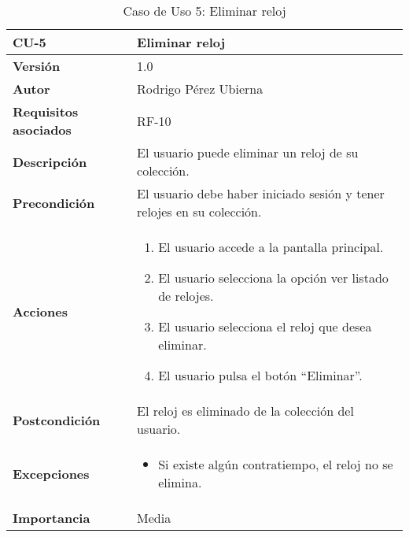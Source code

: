 \begin{table}[p]
	\centering
	\begin{tabularx}{\linewidth}{ p{} p{} }
		\toprule
		\textbf{CU-5} & \textbf{Eliminar reloj}\\
		\toprule
		\textbf{Versión} & 1.0 \\
		\textbf{Autor} & Rodrigo Pérez Ubierna \\
		\textbf{Requisitos asociados} & RF-10 \\
		\textbf{Descripción} & El usuario puede eliminar un reloj de su colección. \\
		\textbf{Precondición} & El usuario debe haber iniciado sesión y tener relojes en su colección. \\
		\textbf{Acciones} &
		\begin{enumerate}
			\def\labelenumi{\arabic{enumi}.}
			\tightlist
			\item El usuario accede a la pantalla principal.
			\item El usuario selecciona la opción ver listado de relojes.
			\item El usuario selecciona el reloj que desea eliminar.
			\item El usuario pulsa el botón ``Eliminar''.
		\end{enumerate}\\
		\textbf{Postcondición} & El reloj es eliminado de la colección del usuario. \\
		\textbf{Excepciones} &
			\begin{itemize}
				\item Si existe algún contratiempo, el reloj no se elimina.
			\end{itemize} \\
		\textbf{Importancia} & Media \\
		\bottomrule
	\end{tabularx}
	\caption{Caso de Uso 5: Eliminar reloj}
\end{table}

